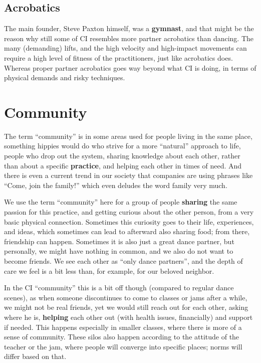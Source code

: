 \subsection{Acrobatics}\label{subsec:acrobatics}

The main founder, Steve Paxton himself, was a \textbf{gymnast}, and that might be the reason why still some of CI resembles more partner acrobatics than dancing.
The many (demanding) lifts, and the high velocity and high-impact movements can require a high level of fitness of the practitioners, just like acrobatics does.
Whereas proper partner acrobatics goes way beyond what CI is doing, in terms of physical demands and risky techniques.

\section{Community}\label{sec:community}

The term ``community'' is in some areas used for people living in the same place, something hippies would do who strive for a more ``natural'' approach to life, people who drop out the system, sharing knowledge about each other, rather than about a specific \textbf{practice}, and helping each other in times of need.
And there is even a current trend in our society that companies are using phrases like ``Come, join the family!'' which even deludes the word family very much.

We use the term ``community'' here for a group of people \textbf{sharing} the same passion for this practice, and getting curious about the other person, from a very basic physical connection.
Sometimes this curiosity goes to their life, experiences, and ideas, which sometimes can lead to afterward also sharing food; from there, friendship can happen.
Sometimes it is also just a great dance partner, but personally, we might have nothing in common, and we also do not want to become friends.
We see each other as ``only dance partners'', and the depth of care we feel is a bit less than, for example, for our beloved neighbor.

In the CI ``community'' this is a bit off though (compared to regular dance scenes), as when someone discontinues to come to classes or jams after a while, we might not be real friends, yet we would still reach out for each other, asking where he is, \textbf{helping} each other out (with health issues, financially) and support if needed.
This happens especially in smaller classes, where there is more of a sense of community.
These silos also happen according to the attitude of the teacher or the jam, where people will converge into specific places; norms will differ based on that.

